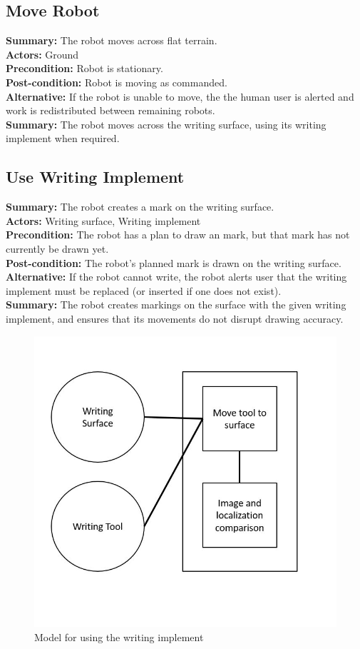 \subsection{Move Robot}
\textbf{Summary:} The robot moves across flat terrain. \\
\textbf{Actors:} Ground \\
\textbf{Precondition:} Robot is stationary. \\
\textbf{Post-condition:} Robot is moving as commanded. \\
\textbf{Alternative:} If the robot is unable to move, the the human user is alerted and work is redistributed between remaining robots. \\
\textbf{Summary:} The robot moves across the writing surface, using its writing implement when required. \\

\subsection{Use Writing Implement}
\textbf{Summary:} The robot creates a mark on the writing surface. \\
\textbf{Actors:} Writing surface, Writing implement \\
\textbf{Precondition:} The robot has a plan to draw an mark, but that mark has not currently be drawn yet. \\
\textbf{Post-condition:} The robot's planned mark is drawn on the writing surface. \\
\textbf{Alternative:} If the robot cannot write, the robot alerts user that the writing implement must be replaced (or inserted if one does not exist). \\
\textbf{Summary:} The robot creates markings on the surface with the given writing implement, and ensures that its movements do not disrupt drawing accuracy. \\

\begin{figure}
 \centering
  \includegraphics[width=0.48\columnwidth]{figs/use_case-use_writing_implement.jpg}
	 \caption{Model for using the writing implement}
 \label{fig:use_tool}
\end{figure}

